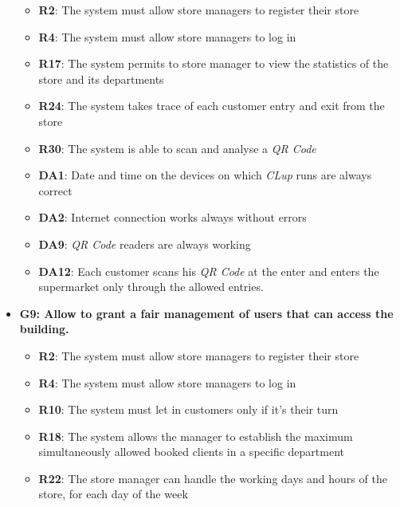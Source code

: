 \documentclass{article}
\begin{document}
\begin{itemize}
					\begin{itemize}
						
						\item {\bfseries R2}: The system must allow store managers to register their store
						\item {\bfseries R4}: The system must allow store managers to log in
						\item {\bfseries R17}: The system permits to store manager to view the statistics of the store and its departments
						\item {\bfseries R24}: The system takes trace of each customer entry and exit from the store
						\item {\bfseries R30}: The system is able to scan and analyse a \emph{QR Code} \\		
				
						\item {\bfseries DA1}: Date and time on the devices on which \emph{CLup} runs are always correct
						\item {\bfseries DA2}: Internet connection works always without errors
						\item {\bfseries DA9}: \emph{QR Code} readers are always working
						\item {\bfseries DA12}: Each customer scans his \emph{QR Code} at the enter and enters the supermarket only through the allowed entries.
							
					\end{itemize}

				\item {\bfseries G9: Allow to grant a fair management of users that can access the building.}	

					\begin{itemize}
						
						\item {\bfseries R2}: The system must allow store managers to register their store
						\item {\bfseries R4}: The system must allow store managers to log in
						\item {\bfseries R10}: The system must let in customers only if it's their turn
						\item {\bfseries R18}: The system allows the manager to establish the maximum simultaneously allowed booked clients in a specific department
						\item {\bfseries R22}: The store manager can handle the working days and hours of the store, for each day of the week
						 

\end{itemize}
\end{itemize}
\end{document}
